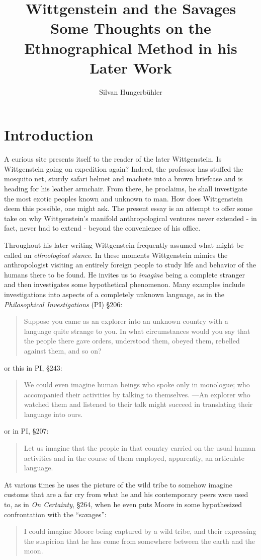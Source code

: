 \documentclass{article}
\title{Wittgenstein and the Savages\\
\large Some Thoughts on the Ethnographical Method in his Later Work}
\date{}
\author{Silvan Hungerb{\"u}hler}
\begin{document}
\maketitle
\section{Introduction}
A curious site presents itself to the reader of the later Wittgenstein. Is Wittgenstein going on expedition again? Indeed, the professor has stuffed the mosquito net, sturdy safari helmet and machete into a brown briefcase and is heading for his leather armchair. From there, he proclaims, he shall investigate the most exotic peoples known and unknown to man. How does Wittgenstein deem this possible, one might ask. The present essay is an attempt to offer some take on why Wittgenstein's manifold anthropological ventures never extended - in fact, never had to extend - beyond the convenience of his office. 

Throughout his later writing Wittgenstein frequently assumed what might be called an \textit{ethnological stance}. In these moments Wittgenstein mimics the anthropologist visiting an entirely foreign people to study life and behavior of the humans there to be found. He invites us to \textit{imagine} being a complete stranger and then investigates some hypothetical phenomenon. Many examples include investigations into aspects of a completely unknown language, as in the \textit{Philosophical Investigations} (PI) §206:
\begin{quote}
Suppose you came as an explorer into an unknown country with a
language quite strange to you. In what circumstances would you
say that the people there gave orders, understood them, obeyed them,
rebelled against them, and so on?
\end{quote}
or this in PI, §243:
\begin{quote}
We could even imagine human beings who spoke only in monologue; who accompanied their activities by talking to themselves. —An explorer who watched them and listened to their talk might succeed in translating their language into ours.
\end{quote}
or in PI, §207: 
\begin{quote}
Let us imagine that the people in that country carried on the usual human activities and in the course of them employed, apparently, an articulate language.\end{quote}
 At various times he uses the picture of the wild tribe to somehow imagine customs that are a far cry from what he and his contemporary peers were used to, as in \textit{On Certainty}, §264, when he even puts Moore in some hypothesized confrontation with the ``savages'':
 \begin{quote}
I could imagine Moore being captured by a wild tribe, and their expressing the suspicion that he has come from somewhere between the earth and the moon.
\end{quote}
\end{document}
